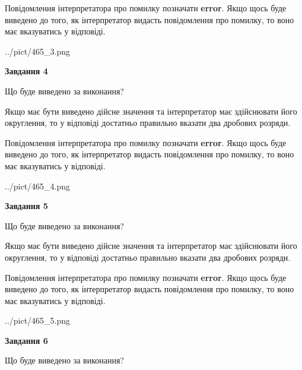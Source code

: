 \documentclass[12pt, ukrainian]{article}
\begin{document}
{\begin {Large}
Повідомлення інтерпретатора про помилку позначати \textbf{error}.
Якщо щось буде виведено до того, як інтерпретатор видасть повідомлення про помилку, 
то воно має вказуватись у відповіді. \par

\begin{center}
	{../pict/465_3.png}
\end{center}
\newpage

{\begin {center}\textbf{Завдання 4}\end {center}}\par
Що буде виведено за виконання? \par

Якщо має бути виведено дійсне значення та інтерпретатор має здійснювати його округлення, 
то у відповіді достатньо правильно вказати два дробових розряди.

Повідомлення інтерпретатора про помилку позначати \textbf{error}.
Якщо щось буде виведено до того, як інтерпретатор видасть повідомлення про помилку, 
то воно має вказуватись у відповіді. \par

\begin{center}
	{../pict/465_4.png}
\end{center}
\newpage

{\begin {center}\textbf{Завдання 5}\end {center}}\par
Що буде виведено за виконання? \par

Якщо має бути виведено дійсне значення та інтерпретатор має здійснювати його округлення, 
то у відповіді достатньо правильно вказати два дробових розряди.

Повідомлення інтерпретатора про помилку позначати \textbf{error}.
Якщо щось буде виведено до того, як інтерпретатор видасть повідомлення про помилку, 
то воно має вказуватись у відповіді. \par

\begin{center}
	{../pict/465_5.png}
\end{center}
\newpage

{\begin {center}\textbf{Завдання 6}\end {center}}\par
Що буде виведено за виконання? \par


\end{Large}}
\end{document}
